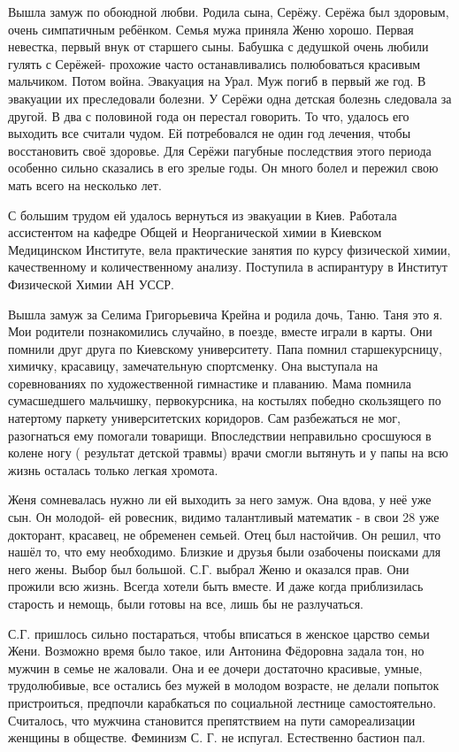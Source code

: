 Вышла замуж по обоюдной любви. Родила сына, Серёжу. Серёжа был здоровым, очень симпатичным ребёнком. Семья мужа приняла Женю хорошо. Первая невестка, первый внук от старшего сыны. Бабушка с дедушкой очень любили гулять с Серёжей- прохожие часто останавливались полюбоваться красивым мальчиком. Потом война. Эвакуация на Урал. Муж погиб в первый же год. В эвакуации их преследовали болезни. У Серёжи одна детская болезнь следовала за другой. В два с половиной года он перестал говорить. То что, удалось его выходить все считали чудом. Ей потребовался не один год лечения, чтобы восстановить своё здоровье. Для Серёжи пагубные последствия этого периода особенно сильно сказались в его зрелые годы. Он много болел и пережил свою мать всего на несколько лет.

С большим трудом ей удалось вернуться из эвакуации в Киев. Работала ассистентом на кафедре Общей и Неорганической химии в Киевском Медицинском Институте, вела практические занятия по курсу физической химии, качественному и количественному анализу. Поступила в аспирантуру в Институт Физической Химии АН УССР.

Вышла замуж за Селима Григорьевича Крейна и родила дочь, Таню. Таня это я. Мои родители познакомились случайно, в поезде, вместе играли в карты. Они помнили друг друга по Киевскому университету. Папа помнил старшекурсницу, химичку, красавицу, замечательную спортсменку. Она выступала на соревнованиях по художественной гимнастике и плаванию. Мама помнила сумасшедшего мальчишку, первокурсника, на костылях победно скользящего по натертому паркету университетских коридоров. Сам разбежаться не мог, разогнаться ему помогали товарищи. Впоследствии неправильно сросшуюся в колене ногу ( результат детской травмы) врачи смогли вытянуть и у папы на всю жизнь осталась только легкая хромота.

Женя сомневалась нужно ли ей выходить за него замуж. Она вдова, у неё уже сын. Он молодой- ей ровесник, видимо талантливый математик - в свои 28 уже докторант, красавец, не обременен семьей. Отец был настойчив. Он решил, что нашёл то, что ему необходимо. Близкие и друзья были озабочены поисками для него жены. Выбор был большой. С.Г. выбрал Женю и оказался прав. Они прожили всю жизнь. Всегда хотели быть вместе. И даже когда приблизилась старость и немощь, были готовы на все, лишь бы не разлучаться.

С.Г. пришлось сильно постараться, чтобы вписаться в женское царство семьи Жени. Возможно время было такое, или Антонина Фёдоровна задала тон, но мужчин в семье не жаловали. Она и ее дочери достаточно красивые, умные, трудолюбивые, все остались без мужей в молодом возрасте, не делали попыток пристроиться, предпочли карабкаться по социальной лестнице самостоятельно. Считалось, что мужчина становится препятствием на пути самореализации женщины в обществе. Феминизм С. Г. не испугал. Естественно бастион пал.

